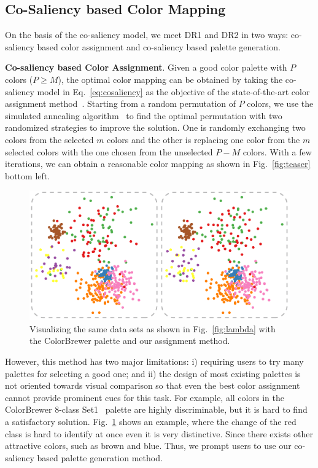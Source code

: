 \subsection{Co-Saliency based Color Mapping}
\label{subsec:solver}
On the basis of the co-saliency model, we meet DR1 and DR2 in two ways: co-saliency based color assignment and co-saliency based palette generation.

\vspace{1.5mm}
\noindent\textbf{Co-saliency based Color Assignment}.
Given a good color palette with $P$ colors ($P\geq M$), the optimal color mapping can be obtained by
taking the co-saliency model in Eq.~\ref{eq:cosaliency} as the objective of the state-of-the-art color assignment method~\cite{Wang2018}. Starting from a random permutation of $P$ colors, we use the simulated annealing algorithm~\cite{aarts1989stochastic} to find the optimal permutation with two randomized strategies to improve the solution. One is randomly exchanging two colors from the selected $m$ colors and the other is replacing one color from the $m$ selected colors with the one chosen from the unselected $P-M$ colors. With a few iterations, we can obtain a reasonable color mapping as shown in Fig.~\ref{fig:teaser} bottom left.

\begin{figure}[h]
\centering
\includegraphics[width=.8\columnwidth]{figures/colorbrewer.pdf}
\caption{Visualizing the same data sets as shown in Fig.~\ref{fig:lambda} with the ColorBrewer palette and our assignment method.}
\vspace*{-3mm}
\label{fig:colorbrewer}
\end{figure}

However, this method has two major limitations: i) requiring users to try many palettes for selecting a good one; and ii) the design of most existing palettes is not oriented towards visual comparison so that even the best color assignment cannot provide prominent cues for this task.
For example, all colors in the ColorBrewer 8-class Set1~\cite{harrower2003colorbrewer} palette are highly discriminable, but it is hard to find a satisfactory solution. Fig.~\ref{fig:colorbrewer} shows an example, where the change of the red class is hard to identify at once even it is very distinctive. Since there exists other attractive colors, such as brown and blue. Thus, we prompt users to use our co-saliency based palette generation method.


